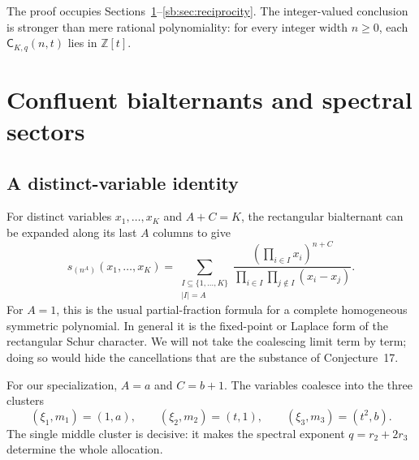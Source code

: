 \documentclass[11pt]{article}
\theoremstyle{definition}
\theoremstyle{remark}
\newcommand{\Z}{\mathbb Z}
\newcommand{\Cblock}{\mathsf C}
\theoremstyle{definition}
\theoremstyle{plain}
\numberwithin{equation}{section}
\begin{document}
The proof occupies Sections~\ref{sb:sec:bialternant}--\ref{sb:sec:reciprocity}.
The integer-valued conclusion is stronger than mere rational polynomiality:
for every integer width $n\ge0$, each $\Cblock_{K,q}(n,t)$ lies in $\Z[t]$.


\section{Confluent bialternants and spectral sectors}
\label{sb:sec:bialternant}

\subsection{A distinct-variable identity}
For distinct variables $x_1,\ldots,x_K$ and $A+C=K$, the rectangular
bialternant can be expanded along its last $A$ columns to give
\begin{equation}
 s_{(n^A)}(x_1,\ldots,x_K)
 =\sum_{\substack{I\subseteq\{1,\ldots,K\}\\|I|=A}}
 \frac{\left(\prod_{i\in I}x_i\right)^{n+C}}
 {\displaystyle\prod_{i\in I}\prod_{j\notin I}(x_i-x_j)}.
 \label{sb:eq:subset-localization}
\end{equation}
For $A=1$, this is the usual partial-fraction formula for a complete
homogeneous symmetric polynomial.  In general it is the fixed-point or
Laplace form of the rectangular Schur character.  We will not take the
coalescing limit term by term; doing so would hide the cancellations that are
the substance of Conjecture~17.

For our specialization, $A=a$ and $C=b+1$.  The variables coalesce into the
three clusters
\begin{equation}
 (\xi_1,m_1)=(1,a),\qquad
 (\xi_2,m_2)=(t,1),\qquad
 (\xi_3,m_3)=(t^2,b).
 \label{sb:eq:clusters}
\end{equation}
The single middle cluster is decisive: it makes the spectral exponent
$q=r_2+2r_3$ determine the whole allocation.
\end{document}
